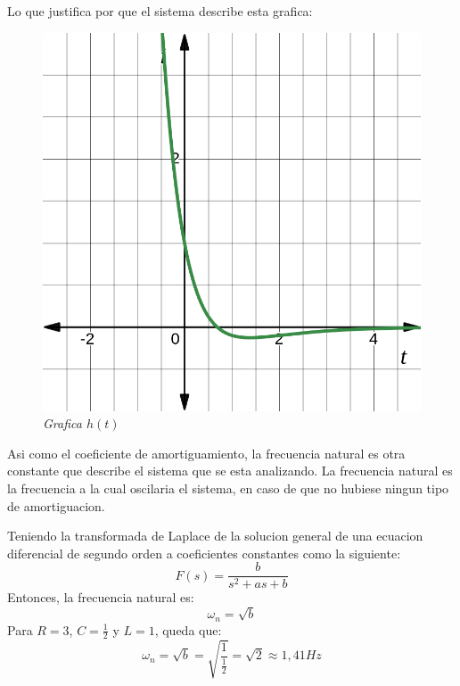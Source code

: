 \documentclass[12pt,a4paper]{report}
\begin{document}
\begin{enumerate}[label=\alph*)]
    Lo que justifica por que el sistema describe esta grafica:
    \noindent
    \begin{figure}[h]
      \centering
      \begin{minipage}[h]{0.5\textwidth}
        \centering
        \includegraphics[width=1\textwidth]{./images/ej4.7.png}
        \textit{Grafica $h(t)$}
      \end{minipage}
    \end{figure}

    Asi como el coeficiente de amortiguamiento, la frecuencia natural es otra constante que describe el sistema que se
    esta analizando. La frecuencia natural es la frecuencia a la cual oscilaria el sistema, en caso de que no hubiese
    ningun tipo de amortiguacion.

    Teniendo la transformada de Laplace de la solucion general de una ecuacion diferencial de segundo orden a
    coeficientes constantes como la siguiente:
    \begin{equation*}
      F(s) = \frac{b}{s^2+as+b}
    \end{equation*}
    Entonces, la frecuencia natural es:
    \begin{equation*}
      \omega_n = \sqrt{b}
    \end{equation*}
    Para $R = 3$, $C = \frac{1}{2}$ y $L = 1$, queda que:
    \begin{equation*}
      \omega_n = \sqrt{b} = \sqrt{\frac{1}{\frac{1}{2}}} = \sqrt{2} \approx 1,\!41 Hz
    \end{equation*}




  \end{enumerate}
\end{document}
